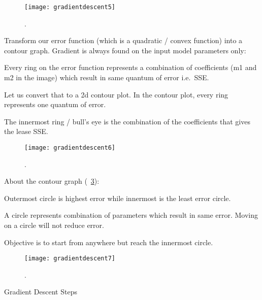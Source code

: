 	\begin{figure}[h]
		\centering
		\texttt{[image: gradientdescent5]}
		\caption{.}
		\label{fig:gradientdescent5}
	\end{figure}


Transform our error function (which is a quadratic / convex function) into a contour graph. Gradient is
always found on the input model parameters only:

	\begin{bulletedlist}
		\item Every ring on the error function represents a combination of coefficients (m1 and m2 in the image) which result in same quantum of error i.e.\ SSE.
		\item Let us convert that to a 2d contour plot. In the contour plot, every ring represents one quantum of error.
		\item The innermost ring / bull's eye is the combination of the coefficients that gives the lease SSE.
	\end{bulletedlist}

	\begin{figure}[h]
		\centering
		\texttt{[image: gradientdescent6]}
		\caption{.}
		\label{fig:gradientdescent6}
	\end{figure}

About the contour graph (\figurename~\ref{fig:gradientdescent7}):
	\begin{bulletedlist}
		\item Outermost circle is highest error while innermost is the least error circle.
		\item A circle represents combination of parameters which result in same error. Moving on a circle will not reduce error.
		\item Objective is to start from anywhere but reach the innermost circle.
	\end{bulletedlist}


	\begin{figure}[h]
		\centering
		\texttt{[image: gradientdescent7]}
		\caption{.}
		\label{fig:gradientdescent7}
	\end{figure}


Gradient Descent Steps

